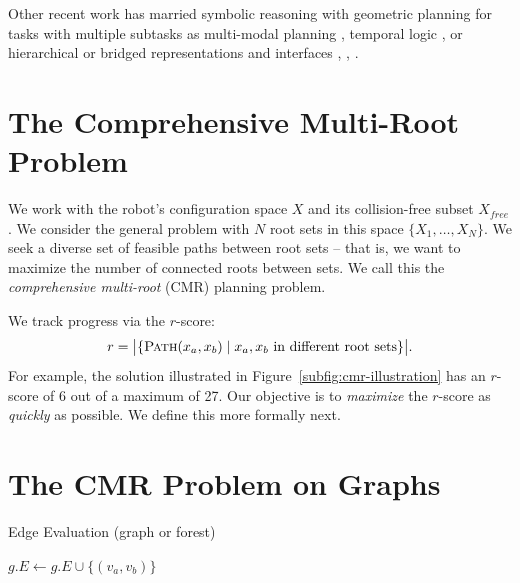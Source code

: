 Other recent work has married symbolic reasoning with geometric planning
for tasks with multiple subtasks
as multi-modal planning \cite{hauser2010multi},
temporal logic \cite{bhatia2010temporalgoals},
or hierarchical or bridged representations and interfaces
\cite{cambon2009hybrid}, \cite{gravot2005asymov},
\cite{srivastava2014taskmotion}.

\section{The Comprehensive Multi-Root Problem}
\label{sec:def}

We work with the robot's configuration space $X$
and its collision-free subset $X_{free}$.
We consider the general problem with $N$ root sets in this space
$\{ X_1, \dots, X_N \}$.
We seek a diverse set of feasible paths between root sets
-- that is, we want to maximize the number of connected roots between sets. 
We call this the \emph{comprehensive multi-root} (CMR) planning problem.

We track progress via the $r$-score:
\begin{equation}
   r = \big| \{
      \textsc{Path}(x_a,x_b) \;|\; x_a,x_b~\text{in different root sets}
      \} \big|.
   \label{eqn:obj}
\end{equation}
For example, the solution illustrated in Figure~\ref{subfig:cmr-illustration}
has an $r$-score of 6 out of a maximum of 27.
Our objective is to \emph{maximize} the $r$-score as \emph{quickly} as
possible.
We define this more formally next.

\section{The CMR Problem on Graphs}
\label{sec:cmr-graphs}

\begin{algorithm}[t]
\caption{Edge Evaluation (graph or forest)}
\begin{algorithmic}[1]
{}
\State \Return {}
\EndIf
{}
\State $g.E \leftarrow g.E \cup \{ (v_{a}, v_{b}) \}$
\EndIf
\EndProcedure
\end{algorithmic}
\label{alg:edge-evaluators}
\end{algorithm}

